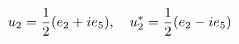 \begin{equation}
u_{2}={1 \over 2}(e_{2}+ie_{5}),\quad u_{2}^{*}={1 \over 2}(e_{2}-ie_{5})
\end{equation}

